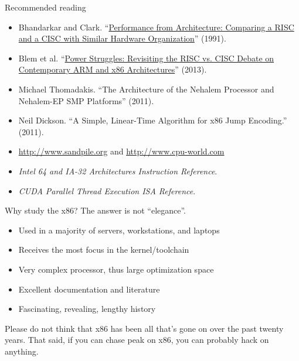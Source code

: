 \documentclass[mathserif,xcolor={dvipsnames,table}]{beamer}
\begin{document}
\begin{frame}{Recommended reading}
\begin{itemize}
\small
\item Bhandarkar and Clark. ``\href{http://dl.acm.org/citation.cfm?id=107003}{Performance from Architecture: Comparing a
RISC and a CISC with Similar Hardware Organization}'' (1991).
\vfill
\item Blem et al. ``\href{http://research.cs.wisc.edu/vertical/papers/2013/hpca13-isa-power-struggles.pdf}{Power Struggles: Revisiting the RISC vs. CISC Debate on
Contemporary ARM and x86 Architectures}'' (2013).
\vfill
\item Michael Thomadakis. ``The Architecture of the Nehalem Processor and
Nehalem-EP SMP Platforms'' (2011).
\vfill
\item Neil Dickson. ``A Simple, Linear-Time Algorithm for x86 Jump Encoding.'' (2011).
\vfill
\item \href{http://www.sandpile.org}{http://www.sandpile.org} and 
\href{http://www.cpu-world.com}{http://www.cpu-world.com}
\vfill
\item \textit{Intel 64 and IA-32 Architectures Instruction Reference}.
\vfill
\item \textit{CUDA Parallel Thread Execution ISA Reference}.
\end{itemize}
\end{frame}

\begin{frame}{Why study the x86?}
The answer is not ``elegance''.
\vfill
\begin{itemize}
\item Used in a majority of servers, workstations, and laptops
\item Receives the most focus in the kernel/toolchain
\item Very complex processor, thus large optimization space
\item Excellent documentation and literature
\item Fascinating, revealing, lengthy history
\end{itemize}
\vfill
Please do not think that x86 has been all that's gone on over the past
twenty years. That said, if you can chase peak on x86, you can
probably hack on anything.
\end{frame}
\end{document}
